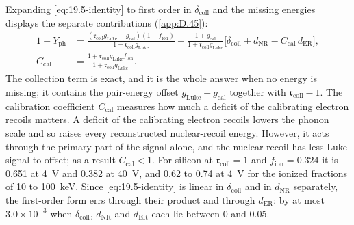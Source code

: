 Expanding \cref{eq:19.5-identity} to first order in $\delta_{\mathrm{coll}}$ and the missing energies displays the separate contributions (\cref{app:D.45}):
\begin{equation}
\begin{split}
  1 - Y_{\mathrm{ph}} &= \frac{(\mathfrak{r}_{\mathrm{coll}}g_{\mathrm{Luke}} - g_{\mathrm{cal}})(1 - f_{\mathrm{ion}})}{1 + \mathfrak{r}_{\mathrm{coll}}g_{\mathrm{Luke}}} + \frac{1 + g_{\mathrm{cal}}}{1 + \mathfrak{r}_{\mathrm{coll}}g_{\mathrm{Luke}}}\bigl[\delta_{\mathrm{coll}} + d_{\mathrm{NR}} - C_{\mathrm{cal}}\,d_{\mathrm{ER}}\bigr] , \\
  C_{\mathrm{cal}} &= \frac{1 + \mathfrak{r}_{\mathrm{coll}}g_{\mathrm{Luke}}f_{\mathrm{ion}}}{1 + \mathfrak{r}_{\mathrm{coll}}g_{\mathrm{Luke}}} .
\end{split}
  \label{eq:19.5-first}
\end{equation}
The collection term is exact, and it is the whole answer when no energy is missing; it contains the pair-energy offset $g_{\mathrm{Luke}} - g_{\mathrm{cal}}$ together with $\mathfrak{r}_{\mathrm{coll}} - 1$. The calibration coefficient $C_{\mathrm{cal}}$ measures how much a deficit of the calibrating electron recoils matters. A deficit of the calibrating electron recoils lowers the phonon scale and so raises every reconstructed nuclear-recoil energy. However, it acts through the primary part of the signal alone, and the nuclear recoil has less Luke signal to offset; as a result $C_{\mathrm{cal}} < 1$. For silicon at $\mathfrak{r}_{\mathrm{coll}} = 1$ and $f_{\mathrm{ion}} = 0.324$ it is 0.651 at \SI{4}{V} and 0.382 at \SI{40}{V}, and 0.62 to 0.74 at \SI{4}{V} for the ionized fractions of 10 to \SI{100}{keV}. Since \cref{eq:19.5-identity} is linear in $\delta_{\mathrm{coll}}$ and in $d_{\mathrm{NR}}$ separately, the first-order form errs through their product and through $d_{\mathrm{ER}}$: by at most $3.0\times10^{-3}$ when $\delta_{\mathrm{coll}}$, $d_{\mathrm{NR}}$ and $d_{\mathrm{ER}}$ each lie between 0 and 0.05.

